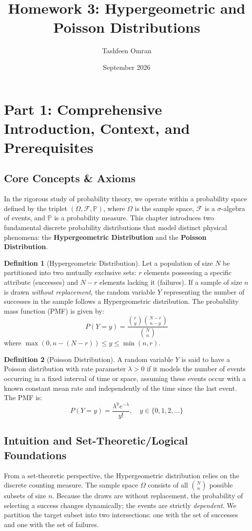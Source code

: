 \documentclass[11pt]{article}
\title{Homework 3: Hypergeometric and Poisson Distributions}
\author{Tashfeen Omran}
\date{September 2026}
\theoremstyle{definition}
\newtheorem{definition}{Definition}[section]
\theoremstyle{remark}
\begin{document}
\maketitle
\tableofcontents
\newpage

\section{Part 1: Comprehensive Introduction, Context, and Prerequisites}

\subsection{Core Concepts \& Axioms}
In the rigorous study of probability theory, we operate within a probability space defined by the triplet $(\Omega, \mathcal{F}, \mathbb{P})$, where $\Omega$ is the sample space, $\mathcal{F}$ is a $\sigma$-algebra of events, and $\mathbb{P}$ is a probability measure. This chapter introduces two fundamental discrete probability distributions that model distinct physical phenomena: the \textbf{Hypergeometric Distribution} and the \textbf{Poisson Distribution}.

\begin{definition}[Hypergeometric Distribution]
Let a population of size $N$ be partitioned into two mutually exclusive sets: $r$ elements possessing a specific attribute (successes) and $N-r$ elements lacking it (failures). If a sample of size $n$ is drawn \textit{without replacement}, the random variable $Y$ representing the number of successes in the sample follows a Hypergeometric distribution. The probability mass function (PMF) is given by:
\[ P(Y = y) = \frac{\binom{r}{y}\binom{N-r}{n-y}}{\binom{N}{n}} \]
where $\max(0, n - (N-r)) \le y \le \min(n, r)$.
\end{definition}

\begin{definition}[Poisson Distribution]
A random variable $Y$ is said to have a Poisson distribution with rate parameter $\lambda > 0$ if it models the number of events occurring in a fixed interval of time or space, assuming these events occur with a known constant mean rate and independently of the time since the last event. The PMF is:
\[ P(Y = y) = \frac{\lambda^y e^{-\lambda}}{y!}, \quad y \in \{0, 1, 2, \dots\} \]
\end{definition}

\subsection{Intuition and Set-Theoretic/Logical Foundations}
From a set-theoretic perspective, the Hypergeometric distribution relies on the discrete counting measure. The sample space $\Omega$ consists of all $\binom{N}{n}$ possible subsets of size $n$. Because the draws are without replacement, the probability of selecting a success changes dynamically; the events are strictly \textit{dependent}. We partition the target subset into two intersections: one with the set of successes and one with the set of failures.
\end{document}
